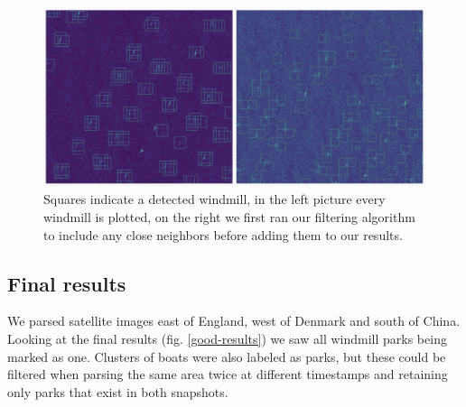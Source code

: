 \begin{figure}[ht]
\begin{center}
\centerline{\includegraphics[width=\columnwidth]{images/detection-filtering.png}}
\caption{Squares indicate a detected windmill, in the left picture every windmill is plotted, on the right we first ran our filtering algorithm to include any close neighbors before adding them to our results.}
\label{detection-filtering}
\end{center}
\end{figure}

\subsection{Final results}

We parsed satellite images east of England, west of Denmark and south of China. Looking at the final results (fig. \ref{good-results}) we saw all windmill parks being marked as one. Clusters of boats were also labeled as parks, but these could be filtered when parsing the same area twice at different timestamps and retaining only parks that exist in both snapshots.

